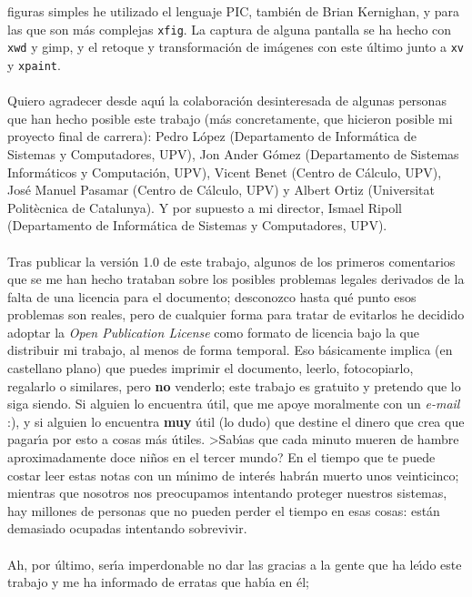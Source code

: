 figuras simples he utilizado el 
lenguaje PIC, tambi\'en de Brian Kernighan, y para las que son m\'as complejas
{\tt xfig}. La captura de alguna pantalla se ha hecho con {\tt xwd} y {\sc
gimp}, y el retoque y transformaci\'on de im\'agenes con este \'ultimo junto a 
{\tt xv} y {\tt xpaint}.\\
\\Quiero agradecer desde aqu\'{\i} la colaboraci\'on desinteresada de algunas
personas que han hecho posible este trabajo (m\'as concretamente, que hicieron
posible mi proyecto final de carrera): Pedro L\'opez (Departamento
de Inform\'atica de Sistemas y Computadores, UPV),
Jon Ander G\'omez (Departamento de Sistemas Inform\'aticos y Computaci\'on,
UPV), Vicent Benet (Centro de C\'alculo, UPV), Jos\'e Manuel Pasamar
(Centro de C\'alculo, UPV) y Albert Ortiz (Universitat Polit\`ecnica de
Catalunya). Y por supuesto a mi director, Ismael Ripoll (Departamento de 
Inform\'atica de Sistemas y Computadores, UPV).\\
\\Tras publicar la versi\'on 1.0 de este trabajo, algunos de los primeros 
comentarios que se me han hecho trataban sobre los posibles problemas legales
derivados de la falta de una licencia para el documento; desconozco hasta qu\'e
punto esos problemas son reales, pero de cualquier forma para tratar de 
evitarlos he decidido adoptar la {\it Open Publication License} como formato de
licencia bajo la que distribuir mi trabajo, al menos de forma temporal. Eso
b\'asicamente implica (en castellano plano) que puedes imprimir el documento, 
leerlo, fotocopiarlo, regalarlo o similares, pero {\bf no} venderlo; este
trabajo es gratuito y pretendo que lo siga siendo. Si alguien lo encuentra
\'util, que me apoye moralmente con un {\it e-mail} :), y si alguien lo 
encuentra {\bf muy} \'util (lo dudo) que destine el dinero que crea que 
pagar\'{\i}a por esto a cosas m\'as \'utiles. >Sab\'{\i}as que cada minuto
mueren de hambre aproximadamente doce ni\~nos en el tercer mundo? En el tiempo
que te puede costar leer estas notas con un m\'{\i}nimo de inter\'es habr\'an
muerto unos veinticinco; mientras que nosotros nos preocupamos intentando 
proteger nuestros sistemas, hay millones de personas que no pueden perder el 
tiempo en esas cosas: est\'an demasiado ocupadas intentando sobrevivir.\\
\\Ah, por \'ultimo, ser\'{\i}a imperdonable no dar las gracias a la gente que ha
le\'{\i}do este trabajo y me ha informado de erratas que hab\'{\i}a en \'el;
